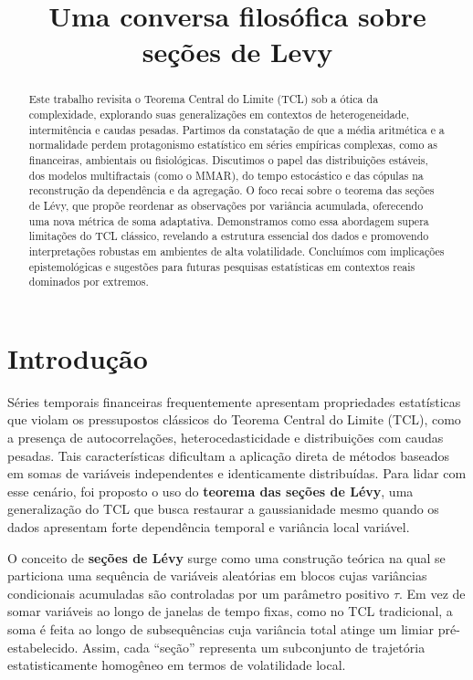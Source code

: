 \documentclass[
]{agujournal2019}
\begin{document}
\title{Uma conversa filosófica sobre seções de Levy}



\begin{abstract}
Este trabalho revisita o Teorema Central do Limite (TCL) sob a ótica da
complexidade, explorando suas generalizações em contextos de
heterogeneidade, intermitência e caudas pesadas. Partimos da constatação
de que a média aritmética e a normalidade perdem protagonismo
estatístico em séries empíricas complexas, como as financeiras,
ambientais ou fisiológicas. Discutimos o papel das distribuições
estáveis, dos modelos multifractais (como o MMAR), do tempo estocástico
e das cópulas na reconstrução da dependência e da agregação. O foco
recai sobre o teorema das seções de Lévy, que propõe reordenar as
observações por variância acumulada, oferecendo uma nova métrica de soma
adaptativa. Demonstramos como essa abordagem supera limitações do TCL
clássico, revelando a estrutura essencial dos dados e promovendo
interpretações robustas em ambientes de alta volatilidade. Concluímos
com implicações epistemológicas e sugestões para futuras pesquisas
estatísticas em contextos reais dominados por extremos.
\end{abstract}




\section{Introdução}\label{introduuxe7uxe3o}

Séries temporais financeiras frequentemente apresentam propriedades
estatísticas que violam os pressupostos clássicos do Teorema Central do
Limite (TCL), como a presença de autocorrelações, heterocedasticidade e
distribuições com caudas pesadas. Tais características dificultam a
aplicação direta de métodos baseados em somas de variáveis independentes
e identicamente distribuídas. Para lidar com esse cenário, foi proposto
o uso do \textbf{teorema das seções de Lévy}, uma generalização do TCL
que busca restaurar a gaussianidade mesmo quando os dados apresentam
forte dependência temporal e variância local variável.

O conceito de \textbf{seções de Lévy} surge como uma construção teórica
na qual se particiona uma sequência de variáveis aleatórias em blocos
cujas variâncias condicionais acumuladas são controladas por um
parâmetro positivo \(\tau\). Em vez de somar variáveis ao longo de
janelas de tempo fixas, como no TCL tradicional, a soma é feita ao longo
de subsequências cuja variância total atinge um limiar pré-estabelecido.
Assim, cada ``seção'' representa um subconjunto de trajetória
estatisticamente homogêneo em termos de volatilidade local.
\end{document}
